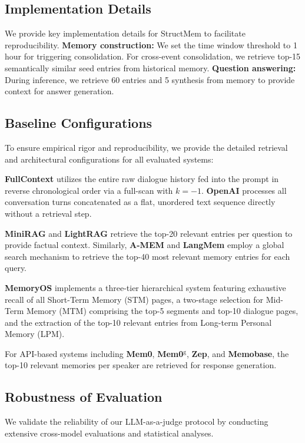 \subsection{Implementation Details}
We provide key implementation details for StructMem to facilitate reproducibility. 
\textbf{Memory construction:} We set the time window threshold to 1 hour for triggering consolidation. For cross-event consolidation, we retrieve top-15 semantically similar seed entries from historical memory. \textbf{Question answering:} During inference, we retrieve 60 entries and 5 synthesis from memory to provide context for answer generation. 

\subsection{Baseline Configurations} \label{appendix:baseline}

To ensure empirical rigor and reproducibility, we provide the detailed retrieval and architectural configurations for all evaluated systems:

\textbf{FullContext} utilizes the entire raw dialogue history fed into the prompt in reverse chronological order via a full-scan with $k=-1$. \textbf{OpenAI} processes all conversation turns concatenated as a flat, unordered text sequence directly without a retrieval step.

\textbf{MiniRAG} and \textbf{LightRAG} retrieve the top-20 relevant entries per question to provide factual context. Similarly, \textbf{A-MEM} and \textbf{LangMem} employ a global search mechanism to retrieve the top-40 most relevant memory entries for each query.

\textbf{MemoryOS} implements a three-tier hierarchical system featuring exhaustive recall of all Short-Term Memory (STM) pages, a two-stage selection for Mid-Term Memory (MTM) comprising the top-5 segments and top-10 dialogue pages, and the extraction of the top-10 relevant entries from Long-term Personal Memory (LPM).

For API-based systems including \textbf{Mem0}, \textbf{Mem0$^\text{g}$}, \textbf{Zep}, and \textbf{Memobase}, the top-10 relevant memories per speaker are retrieved for response generation.

\subsection{Robustness of Evaluation}\label{appendix:robustness}

We validate the reliability of our LLM-as-a-judge protocol by conducting extensive cross-model evaluations and statistical analyses. 

